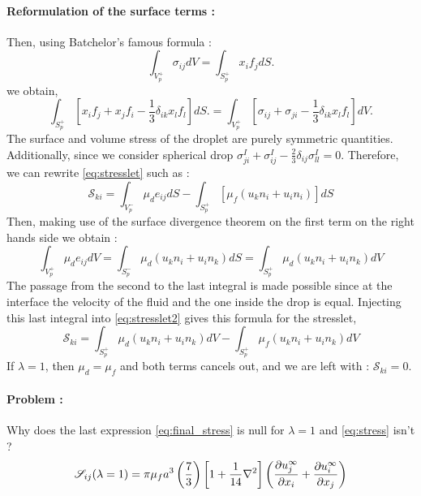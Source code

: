 \documentclass[12pt]{My_preprint}
\renewcommand{\ref}[1]{\autoref{#1}}
\begin{document}
\paragraph*{Reformulation of the surface terms :}
Then, using Batchelor’s famous formula :
\begin{equation*}
    \int_{V^+_p} \sigma_{ij} dV 
    = \int_{S^+_p} x_i f_j dS.
    \label{eq:bachelor}
\end{equation*}
 we obtain, 
\begin{equation}
    \int_{S^+_p} \left[
        x_i f_j+ x_j f_i - \frac{1}{3}\delta_{ik}x_lf_l
    \right]  dS.
    = \int_{V^+_p} \left[
        \sigma_{ij} 
        + \sigma_{ji} 
        - \frac{1}{3}\delta_{ik}x_lf_l
        \right]
    dV.
\end{equation}
The surface and volume stress of the droplet are purely symmetric quantities.
Additionally, since we consider spherical drop $\sigma^I_{ji} + \sigma^I_{ij} -\frac{2}{3}\delta_{ij}\sigma_{ll}^I = 0$.
Therefore, we can rewrite \ref{eq:stresslet} such as :
\begin{equation}
    \label{eq:stresslet2}
    \mathscr{S}_{ki}
    = 
    \int_{V_p^-}
        \mu_d e_{ij} 
    dS
    - \int_{S_p^+}
    \left[
         \mu_f (u_k n_i+u_i n_i)
    \right]
    dS
\end{equation}
Then, making use of the surface divergence theorem on the first term on the right hands side we obtain :
\begin{equation*}
    \int_{V_p^+}
        \mu_d e_{ij}
    dV
    = \int_{S_p^-}
        \mu_d (u_k n_i+u_i n_k)
    dS
    = 
    \int_{S_p^+}
        \mu_d (u_k n_i+u_i n_k)
    dV
\end{equation*}
The passage from the second to the last integral is made possible since at the interface the velocity of the fluid and the one inside the drop is equal. 
Injecting this last integral into \ref{eq:stresslet2} gives this formula for the stresslet, 
\begin{equation}
    \mathscr{S}_{ki}
    = 
    \int_{S_p^+}
        \mu_d (u_k n_i+u_i n_k)
    dV
    - \int_{S_p^+}
    \mu_f (u_k n_i+u_i n_k)
    dV
    \label{eq:final_stress}
\end{equation}
If $\lambda =1$, then $\mu_d=\mu_f$ and both terms cancels out, and we are left with :  $\mathscr{S}_{ki} = 0$. 

\paragraph*{Problem :}
Why does the last expression \ref{eq:final_stress} is null for $\lambda=1$ and \ref{eq:stress} isn't ?
\begin{equation}
    \label{eq:stress}
    \mathscr{S}_{ij}(\lambda=1)
    =\pi \mu_f a^3 \left(
        \frac{7}{3}
    \right)
    \left[
        1+\frac{1}{14}\grad^2
    \right]
    \left(
        \frac{\partial u^\infty_j}{\partial x_i}
        + \frac{\partial u^\infty_i}{\partial x_j}
    \right)
\end{equation}

\end{document}
